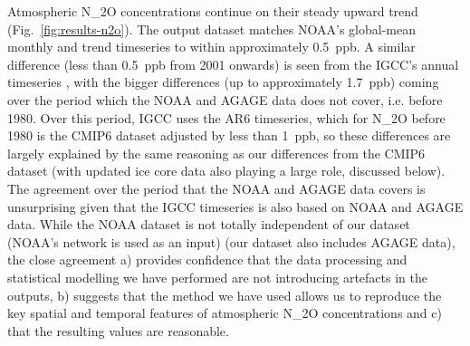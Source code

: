 Atmospheric N_2O concentrations continue on their steady upward trend (Fig.~\ref{fig:results-n2o}).
The output dataset matches NOAA's global-mean monthly and trend timeseries \citep{lan_ch4-n2o-sf6-trends_2026} to within approximately 0.5~ppb.
A similar difference (less than 0.5~ppb from 2001 onwards)
is seen from the IGCC's annual timeseries \citep{forster_igcc_2026,smith_igcc-forcings_2026},
with the bigger differences (up to approximately 1.7~ppb) coming over the period which the NOAA and AGAGE data does not cover,
i.e. before 1980.
Over this period, IGCC uses the AR6 timeseries, which for N_2O before 1980 is the CMIP6 dataset adjusted by less than 1~ppb,
so these differences are largely explained by the same reasoning as our differences from the CMIP6 dataset
(with updated ice core data also playing a large role, discussed below).
The agreement over the period that the NOAA and AGAGE data covers
is unsurprising given that the IGCC timeseries is also based on NOAA and AGAGE data.
While the NOAA dataset is not totally independent of our dataset (NOAA's network is used as an input)
(our dataset also includes AGAGE \citep{prinn_ale-gage-agage_2000,prinn_agage_2018} data),
the close agreement a) provides confidence that the data processing and statistical modelling we have performed are not introducing artefacts in the outputs,
b) suggests that the method we have used allows us to reproduce the key spatial and temporal features of atmospheric N_2O concentrations
and c) that the resulting values are reasonable.

